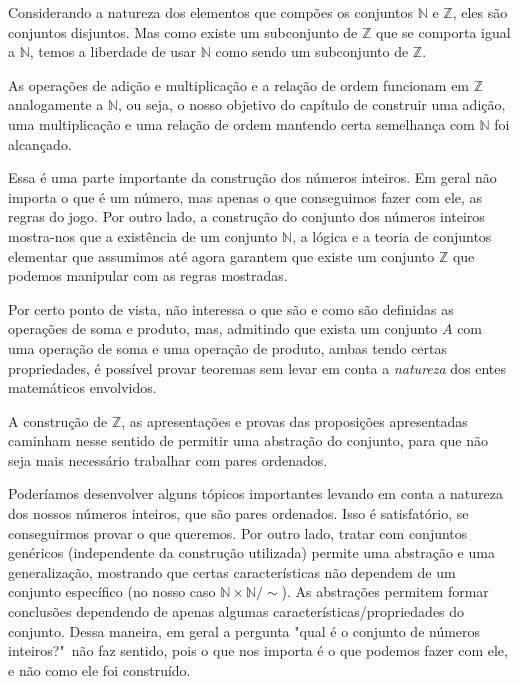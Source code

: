 \documentclass[../main.tex]{subfiles}
\begin{document}
Considerando a natureza dos elementos que compões os conjuntos $\mathbb{N}$ e $\mathbb{Z}$, eles são conjuntos disjuntos. Mas como existe um subconjunto de $\mathbb{Z}$ que se comporta igual a $\mathbb{N}$, temos a liberdade de usar $\mathbb{N}$ como sendo um subconjunto de $\mathbb{Z}$.  

As operações de adição e multiplicação e a relação de ordem funcionam em $\mathbb{Z}$ analogamente a $\mathbb{N}$, ou seja, o nosso objetivo do capítulo de construir uma adição, uma multiplicação e uma relação de ordem mantendo certa semelhança com $\mathbb{N}$ foi alcançado.

Essa é uma parte importante da construção dos números inteiros. Em geral não importa o que é um número, mas apenas o que conseguimos fazer com ele, as regras do jogo. Por outro lado, a construção do conjunto dos números inteiros mostra-nos que a existência de um conjunto $\mathbb{N}$, a lógica e a teoria de conjuntos elementar que assumimos até agora garantem que existe um conjunto $\mathbb{Z}$ que podemos manipular com as regras mostradas.

Por certo ponto de vista, não interessa o que são e como são definidas as operações de soma e produto, mas, admitindo que exista um conjunto $A$ com uma operação de soma e uma operação de produto, ambas tendo certas propriedades, é possível provar teoremas sem levar em conta a \emph{natureza} dos entes matemáticos envolvidos.

A construção de $\mathbb{Z}$, as apresentações e provas das proposições apresentadas caminham nesse sentido de permitir uma abstração do conjunto, para que não seja mais necessário trabalhar com pares ordenados.

Poderíamos desenvolver alguns tópicos importantes levando em conta a natureza dos nossos números inteiros, que são pares ordenados. Isso é satisfatório, se conseguirmos provar o que queremos. Por outro lado, tratar com conjuntos genéricos (independente da construção utilizada) permite uma abstração e uma generalização, mostrando que certas características não dependem de um conjunto específico (no nosso caso $\mathbb{N} \times \mathbb{N} / \sim$). As abstrações permitem formar conclusões dependendo de apenas algumas características/propriedades do conjunto. Dessa maneira, em geral a pergunta "qual é o conjunto de números inteiros?"\ não faz sentido, pois o que nos importa é o que podemos fazer com ele, e não como ele foi construído. 
\end{document}
